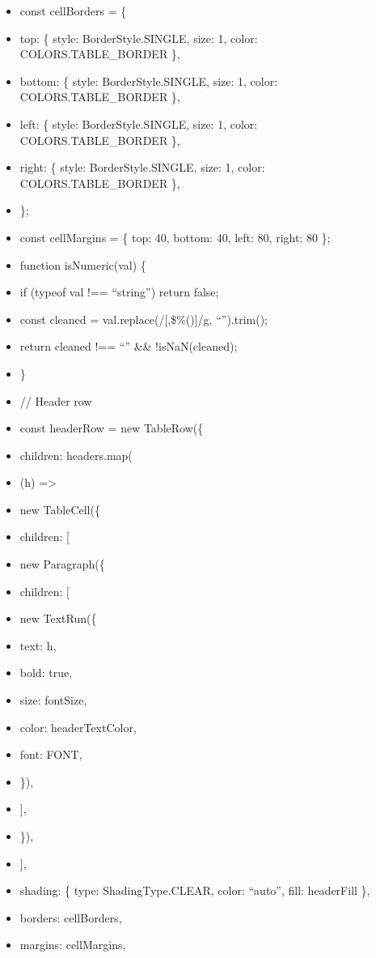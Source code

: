 \documentclass[11pt]{article}
\begin{document}
\begin{itemize}[leftmargin=*,itemsep=2pt,topsep=2pt]
\item {} const cellBorders = \{
\item {} top: \{ style: BorderStyle.SINGLE, size: 1, color: COLORS.TABLE\_\allowbreak{}BORDER \},
\item {} bottom: \{ style: BorderStyle.SINGLE, size: 1, color: COLORS.TABLE\_\allowbreak{}BORDER \},
\item {} left: \{ style: BorderStyle.SINGLE, size: 1, color: COLORS.TABLE\_\allowbreak{}BORDER \},
\item {} right: \{ style: BorderStyle.SINGLE, size: 1, color: COLORS.TABLE\_\allowbreak{}BORDER \},
\item {} \};
\item {} const cellMargins = \{ top: 40, bottom: 40, left: 80, right: 80 \};
\item {} function isNumeric(val) \{
\item {} if (typeof val !== ``string'') return false;
\item {} const cleaned = val.replace(/[,\$\%()]/g, ``'').trim();
\item {} return cleaned !== ``'' \&\& !isNaN(cleaned);
\item {} \}
\item {} // Header row
\item {} const headerRow = new TableRow(\{
\item {} children: headers.map(
\item {} (h) =>
\item {} new TableCell(\{
\item {} children: [
\item {} new Paragraph(\{
\item {} children: [
\item {} new TextRun(\{
\item {} text: h,
\item {} bold: true,
\item {} size: fontSize,
\item {} color: headerTextColor,
\item {} font: FONT,
\item {} \}),
\item {} ],
\item {} \}),
\item {} ],
\item {} shading: \{ type: ShadingType.CLEAR, color: ``auto'', fill: headerFill \},
\item {} borders: cellBorders,
\item {} margins: cellMargins,

\end{itemize}
\end{document}
